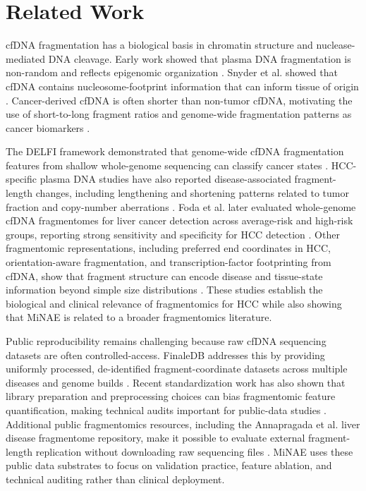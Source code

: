 \documentclass[conference]{IEEEtran}
\begin{document}
\section{Related Work}
cfDNA fragmentation has a biological basis in chromatin structure and nuclease-mediated DNA cleavage. Early work showed that plasma DNA fragmentation is non-random and reflects epigenomic organization \cite{ivanov2015nonrandom}. Snyder et al. showed that cfDNA contains nucleosome-footprint information that can inform tissue of origin \cite{snyder2016cellfree}. Cancer-derived cfDNA is often shorter than non-tumor cfDNA, motivating the use of short-to-long fragment ratios and genome-wide fragmentation patterns as cancer biomarkers \cite{mouliere2011fragmentation,cristiano2019genomewide}.

The DELFI framework demonstrated that genome-wide cfDNA fragmentation features from shallow whole-genome sequencing can classify cancer states \cite{cristiano2019genomewide}. HCC-specific plasma DNA studies have also reported disease-associated fragment-length changes, including lengthening and shortening patterns related to tumor fraction and copy-number aberrations \cite{jiang2015lengthening}. Foda et al. later evaluated whole-genome cfDNA fragmentomes for liver cancer detection across average-risk and high-risk groups, reporting strong sensitivity and specificity for HCC detection \cite{foda2023detecting}. Other fragmentomic representations, including preferred end coordinates in HCC, orientation-aware fragmentation, and transcription-factor footprinting from cfDNA, show that fragment structure can encode disease and tissue-state information beyond simple size distributions \cite{jiang2018preferred,sun2019orientation,ulz2019inference}. These studies establish the biological and clinical relevance of fragmentomics for HCC while also showing that MiNAE is related to a broader fragmentomics literature.

Public reproducibility remains challenging because raw cfDNA sequencing datasets are often controlled-access. FinaleDB addresses this by providing uniformly processed, de-identified fragment-coordinate datasets across multiple diseases and genome builds \cite{zheng2021finaledb}. Recent standardization work has also shown that library preparation and preprocessing choices can bias fragmentomic feature quantification, making technical audits important for public-data studies \cite{wang2025standardized}. Additional public fragmentomics resources, including the Annapragada et al. liver disease fragmentome repository, make it possible to evaluate external fragment-length replication without downloading raw sequencing files \cite{annapragada2026cirrhosis}. MiNAE uses these public data substrates to focus on validation practice, feature ablation, and technical auditing rather than clinical deployment.
\end{document}
